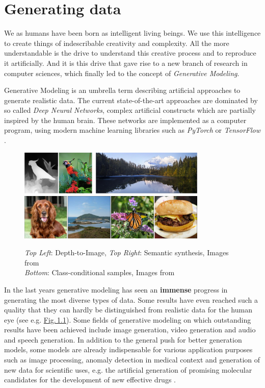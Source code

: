 
\section{Generating data} \label{sec:1.1}
\thispagestyle{plain}
We as humans have been born as intelligent living beings. We use this intelligence to create things of indescribable creativity and complexity. All the more understandable is the drive to understand this creative process and to reproduce it artificially. And it is this drive that gave rise to a new branch of research in computer sciences, which finally led to the concept of \textit{Generative Modeling}.

\thispagestyle{plain}
Generative Modeling is an umbrella term describing artificial approaches to generate realistic data. The current state-of-the-art approaches are dominated by so called \textit{Deep Neural Networks}, complex artificial constructs which are partially inspired by the human brain. These networks are implemented as a computer program, using modern machine learning libraries such as \textit{PyTorch} \cite{pytorch} or \textit{TensorFlow} \cite{tensorflow}.

%
\begin{figure}[] \label{fig:1.1}
    \centering
    \includegraphics[width=0.8\textwidth]{Chapters/figures/transformer.PNG}
    \includegraphics[width=0.8\textwidth]{Chapters/figures/biggan.PNG}
    \caption[Examples for state-of-the-art samples]{\textit{Top Left}: Depth-to-Image, \textit{Top Right}: Semantic synthesis, Images from \cite{taming}\\\textit{Bottom}: Class-conditional samples, Images from \cite{biggan}} 
\end{figure}
%
\thispagestyle{plain}
In the last years generative modeling has seen an \textbf{immense} progress in generating the most diverse types of data. Some results have even reached such a quality that they can hardly be distinguished from realistic data for the human eye (see e.g. \hyperref[fig:1.1]{Fig.\,1.1}). Some fields of generative modeling on which outstanding results have been achieved include image generation, video generation and audio and speech generation. In addition to the general push for better generation models, some models are already indispensable for various application purposes such as image processing, anomaly detection in medical context and generation of new data for scientific uses, e.g. the artificial generation of promising molecular candidates for the development of new effective drugs \cite{molgrad}.
\thispagestyle{plain}

